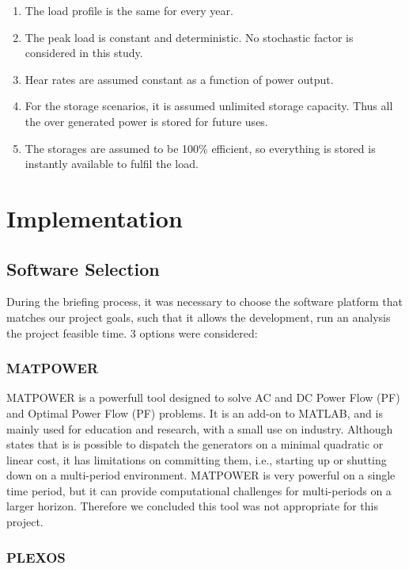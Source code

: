 \documentclass[12pt,LUDisStyle,twosided]{book}
\begin{document}
\begin{enumerate}
\item The load profile is the same for every year.
\item The peak load is constant and deterministic. No stochastic factor is considered in this study.
\item Hear rates are assumed constant as a function of power output.
\item For the storage scenarios, it is assumed unlimited storage capacity. Thus all the over generated power is stored for future uses.
\item The storages are assumed to be 100\% efficient, so everything is stored is instantly available to fulfil the load.
\end{enumerate}

\section{Implementation}


\subsection{Software Selection}

During the briefing process, it was necessary to choose the software platform that matches our project goals, such that it allows the development, run an analysis the project feasible time. 3 options were considered:

\subsubsection{MATPOWER}

MATPOWER is a powerfull tool designed to solve AC and DC Power Flow (PF) and Optimal Power Flow (PF) problems. It is an add-on to MATLAB, and is mainly used for education and research, with a small use on industry. \cite{zimmerman} Although \citeauthor{zimmerman} states that is is possible to dispatch the generators on a minimal quadratic or linear cost, it has limitations on committing them, i.e., starting up or shutting down on a multi-period environment. MATPOWER is very powerful on a single time period, but it can provide computational challenges for multi-periods on a larger horizon. Therefore we concluded this tool was not appropriate for this project.

\subsubsection{PLEXOS \textregistered }
\end{document}
